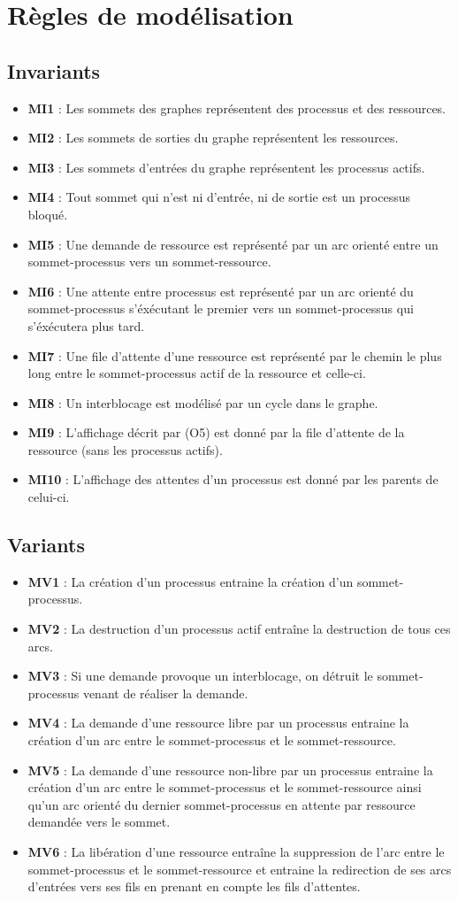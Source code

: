 \documentclass{article}
\newcommand{\bitem}{\item[\textbullet]}
\begin{document}
\section{Règles de modélisation}

\subsection{Invariants}
\begin{itemize}
  \bitem \textbf{MI1} : Les sommets des graphes représentent des processus et des ressources.
  \bitem \textbf{MI2} : Les sommets de sorties du graphe représentent les ressources.
  \bitem \textbf{MI3} : Les sommets d'entrées du graphe représentent les processus actifs.
  \bitem \textbf{MI4} : Tout sommet qui n'est ni d'entrée, ni de sortie est un processus bloqué.
  \bitem \textbf{MI5} : Une demande de ressource est représenté par un arc orienté entre un sommet-processus vers un sommet-ressource.
  \bitem \textbf{MI6} : Une attente entre processus est représenté par un arc orienté du sommet-processus s'éxécutant le premier vers un sommet-processus qui s'éxécutera plus tard.
  \bitem \textbf{MI7} : Une file d'attente d'une ressource est représenté par le chemin le plus long entre le sommet-processus actif de la ressource et celle-ci.
  \bitem \textbf{MI8} : Un interblocage est modélisé par un cycle dans le graphe.
  \bitem \textbf{MI9} : L'affichage décrit par (O5) est donné par la file d'attente de la ressource (sans les processus actifs).
  \bitem \textbf{MI10} : L'affichage des attentes d'un processus est donné par les parents de celui-ci.
\end{itemize}

\subsection{Variants}
\begin{itemize}
  \bitem \textbf{MV1} : La création d'un processus entraine la création d'un sommet-processus.
  \bitem \textbf{MV2} : La destruction d'un processus actif entraîne la destruction de tous ces arcs.
  \bitem \textbf{MV3} : Si une demande provoque un interblocage, on détruit le sommet-processus venant de réaliser la demande.
  \bitem \textbf{MV4} : La demande d'une ressource libre par un processus entraine la création  d'un arc entre le sommet-processus et le sommet-ressource.
  \bitem \textbf{MV5} : La demande d'une ressource non-libre par un processus entraine la création  d'un arc entre le sommet-processus et le sommet-ressource ainsi qu'un arc orienté du dernier sommet-processus en attente par ressource demandée vers le sommet.
  \bitem \textbf{MV6} : La libération d'une ressource entraîne la suppression de l'arc entre le sommet-processus et le sommet-ressource et entraine la redirection de ses arcs d'entrées vers ses fils en prenant en compte les fils d'attentes.
\end{itemize}
\end{document}
